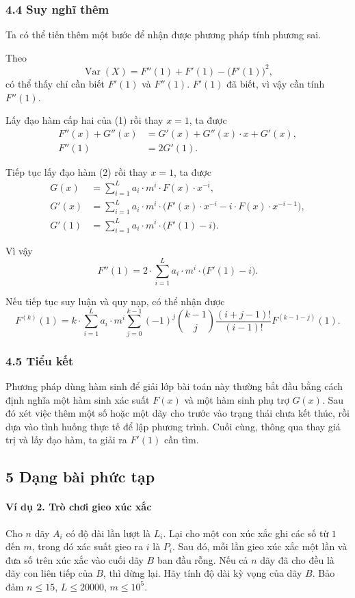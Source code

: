 \documentclass[11pt]{article}
\begin{document}
\subsubsection*{4.4 Suy nghĩ thêm}

Ta có thể tiến thêm một bước để nhận được phương pháp tính phương sai.

Theo
\[
  \operatorname{Var}(X)=F''(1)+F'(1)-\bigl(F'(1)\bigr)^2,
\]
có thể thấy chỉ cần biết \(F'(1)\) và \(F''(1)\). \(F'(1)\) đã biết, vì vậy cần
tính \(F''(1)\).

Lấy đạo hàm cấp hai của (1) rồi thay \(x=1\), ta được
\begin{align}
  F''(x)+G''(x) &= G'(x)+G''(x)\cdot x+G'(x),\\
  F''(1) &= 2G'(1).
\end{align}

Tiếp tục lấy đạo hàm (2) rồi thay \(x=1\), ta được
\begin{align}
  G(x) &= \sum_{i=1}^{L}a_i\cdot m^i\cdot F(x)\cdot x^{-i},\\
  G'(x) &= \sum_{i=1}^{L}a_i\cdot m^i\cdot
          \bigl(F'(x)\cdot x^{-i}-i\cdot F(x)\cdot x^{-i-1}\bigr),\\
  G'(1) &= \sum_{i=1}^{L}a_i\cdot m^i\cdot \bigl(F'(1)-i\bigr).
\end{align}

Vì vậy
\[
  F''(1)=2\cdot\sum_{i=1}^{L}a_i\cdot m^i\cdot \bigl(F'(1)-i\bigr).
\]

Nếu tiếp tục suy luận và quy nạp, có thể nhận được
\[
  F^{(k)}(1)=k\cdot\sum_{i=1}^{L}a_i\cdot m^i
  \sum_{j=0}^{k-1}(-1)^j\binom{k-1}{j}
  \frac{(i+j-1)!}{(i-1)!}F^{(k-1-j)}(1).
\]

\subsubsection*{4.5 Tiểu kết}

Phương pháp dùng hàm sinh để giải lớp bài toán này thường bắt đầu bằng cách
định nghĩa một hàm sinh xác suất \(F(x)\) và một hàm sinh phụ trợ \(G(x)\). Sau
đó xét việc thêm một số hoặc một dãy cho trước vào trạng thái chưa kết thúc, rồi
dựa vào tình huống thực tế để lập phương trình. Cuối cùng, thông qua thay giá
trị và lấy đạo hàm, ta giải ra \(F'(1)\) cần tìm.

\subsection*{5 Dạng bài phức tạp}

\paragraph{Ví dụ 2. Trò chơi gieo xúc xắc}
Cho \(n\) dãy \(A_i\) có độ dài lần lượt là \(L_i\). Lại cho một con xúc xắc ghi
các số từ \(1\) đến \(m\), trong đó xác suất gieo ra \(i\) là \(P_i\). Sau đó,
mỗi lần gieo xúc xắc một lần và đưa số trên xúc xắc vào cuối dãy \(B\) ban đầu
rỗng. Nếu cả \(n\) dãy đã cho đều là dãy con liên tiếp của \(B\), thì dừng lại.
Hãy tính độ dài kỳ vọng của dãy \(B\). Bảo đảm \(n\le 15\), \(L\le 20000\),
\(m\le 10^5\).
\end{document}
